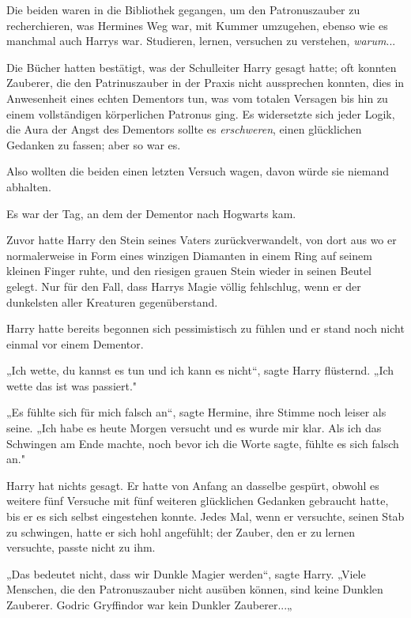 {Die beiden waren in die Bibliothek gegangen, um den Patronuszauber zu recherchieren, was Hermines Weg war, mit Kummer umzugehen, ebenso wie es manchmal auch Harrys war. Studieren, lernen, versuchen zu verstehen, \emph{warum}...

Die Bücher hatten bestätigt, was der Schulleiter Harry gesagt hatte; oft konnten Zauberer, die den Patrinuszauber in der Praxis nicht aussprechen konnten, dies in Anwesenheit eines echten Dementors tun, was vom totalen Versagen bis hin zu einem vollständigen körperlichen Patronus ging. Es widersetzte sich jeder Logik, die Aura der Angst des Dementors sollte es \emph{erschweren}, einen glücklichen Gedanken zu fassen; aber so war es.

Also wollten die beiden einen letzten Versuch wagen, davon würde sie niemand abhalten.

Es war der Tag, an dem der Dementor nach Hogwarts kam.

Zuvor hatte Harry den Stein seines Vaters zurückverwandelt, von dort aus wo er normalerweise in Form eines winzigen Diamanten in einem Ring auf seinem kleinen Finger ruhte, und den riesigen grauen Stein wieder in seinen Beutel gelegt. Nur für den Fall, dass Harrys Magie völlig fehlschlug, wenn er der dunkelsten aller Kreaturen gegenüberstand.

Harry hatte bereits begonnen sich pessimistisch zu fühlen und er stand noch nicht einmal vor einem Dementor.

„Ich wette, du kannst es tun und ich kann es nicht“, sagte Harry flüsternd. „Ich wette das ist was passiert."

„Es fühlte sich für mich falsch an“, sagte Hermine, ihre Stimme noch leiser als seine. „Ich habe es heute Morgen versucht und es wurde mir klar. Als ich das Schwingen am Ende machte, noch bevor ich die Worte sagte, fühlte es sich falsch an."

Harry hat nichts gesagt. Er hatte von Anfang an dasselbe gespürt, obwohl es weitere fünf Versuche mit fünf weiteren glücklichen Gedanken gebraucht hatte, bis er es sich selbst eingestehen konnte. Jedes Mal, wenn er versuchte, seinen Stab zu schwingen, hatte er sich hohl angefühlt; der Zauber, den er zu lernen versuchte, passte nicht zu ihm.

„Das bedeutet nicht, dass wir Dunkle Magier werden“, sagte Harry. „Viele Menschen, die den Patronuszauber nicht ausüben können, sind keine Dunklen Zauberer. Godric Gryffindor war kein Dunkler Zauberer...„

}
